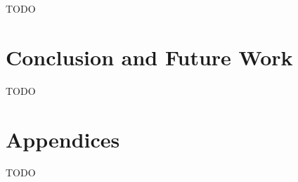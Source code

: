 \documentclass[english, 12pt, a4paper, elec, utf8, a-1b, online]{aaltothesis}
\begin{document}
TODO
\clearpage

\section{Conclusion and Future Work} 

TODO


\clearpage




\clearpage

\thesisappendix

\section{Appendices}
TODO
\end{document}
